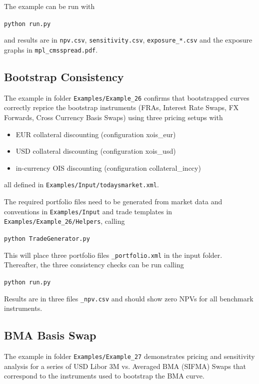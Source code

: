 \documentclass[12pt, a4paper]{article}
\begin{document}
The example can be run with

\medskip
\centerline{\tt python run.py}

\medskip
and results are in {\tt npv.csv}, {\tt sensitivity.csv}, {\tt exposure\_*.csv} 
and the exposure graphs in {\tt mpl\_cmsspread.pdf}.

\subsection{Bootstrap Consistency}%

The example in folder {\tt Examples/Example\_26} confirms that bootstrapped curves 
correctly reprice the bootstrap instruments (FRAs, Interest Rate Swaps, FX Forwards, Cross
Currency Basis Swaps) using three pricing setups with
\begin{itemize}
\item EUR collateral discounting (configuration xois\_eur)
\item USD collateral discounting (configuration xois\_usd)
\item in-currency OIS discounting (configuration collateral\_inccy)
\end{itemize}
all defined in {\tt Examples/Input/todaysmarket.xml}.

\medskip
The required portfolio files need to be generated from market data and conventions in
{\tt Examples/Input} and trade templates in 
{\tt Examples/Example\_26/Helpers}, calling

\medskip
\centerline{\tt python TradeGenerator.py}

\medskip
This will place three portfolio files {\tt *\_portfolio.xml} in the input folder.
Thereafter, the three consistency checks can be run calling

\medskip
\centerline{\tt python run.py}

\medskip
Results are in three files {\tt *\_npv.csv} and should show zero NPVs for all benchmark instruments.

\subsection{BMA Basis Swap}%
\label{example:27}

The example in folder {\tt Examples/Example\_27} demonstrates pricing 
and sensitivity analysis for a series of USD Libor 3M vs. Averaged BMA (SIFMA) 
Swaps that correspond to the instruments used to bootstrap the BMA curve. 
\end{document}
